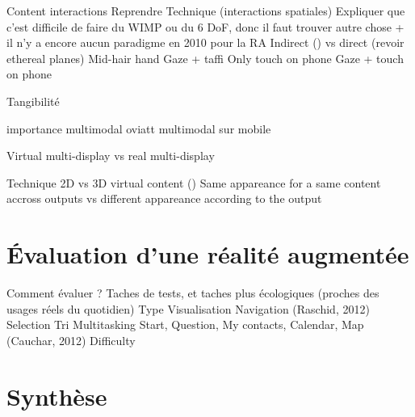         Content interactions
        	Reprendre \cite{Bernatchez2008}
        	Technique (interactions spatiales)
	        	Expliquer que c'est difficile de faire du WIMP ou du 6 DoF, donc il faut trouver autre chose \citet{AzumaBaillotBehringerEtAl2001} + il n'y a encore aucun paradigme en 2010 pour la RA \cite{VanKrevelenPoelman2010}
	        	Indirect (\cite{TeatherStuerzlinger2011}) vs direct (revoir ethereal planes)
	            Mid-hair hand \cite{EnsFinneganIrani2014} \cite{ChanKaoChenEtAl2010} \cite{JonesSodhiForsythEtAl2012}
	            Gaze + taffi 
	            Only touch on phone 
	            Gaze + touch on phone

	        Tangibilité

            importance multimodal oviatt \cite{Oviatt2003}
            multimodal sur mobile \cite{HuerstVanWezel2011}

        Virtual multi-display vs real multi-display 

        Technique 
            2D vs 3D virtual content (\cite{SerranoHildebrandtSubramanianEtAl2014})
            Same appareance for a same content accross outputs vs different appareance according to the output \cite{GrubertHeinischQuigleyEtAl2015} 


\section*{Évaluation d'une réalité augmentée}
Comment évaluer ? Taches de tests, et taches plus écologiques (proches des usages réels du quotidien) \cite{DuenserGrassetBillinghurst2008}
    Type
        Visualisation 
        Navigation \cite{EnsFinneganIrani2014} (Raschid, 2012) 
        Selection \cite{EnsFinneganIrani2014}
        Tri \cite{RobertsonCzerwinskiLarsonEtAl1998}
        Multitasking 
            Start, Question, My contacts, Calendar, Map (Cauchar, 2012) \cite{EnsFinneganIrani2014} 
    Difficulty


\section*{Synthèse}